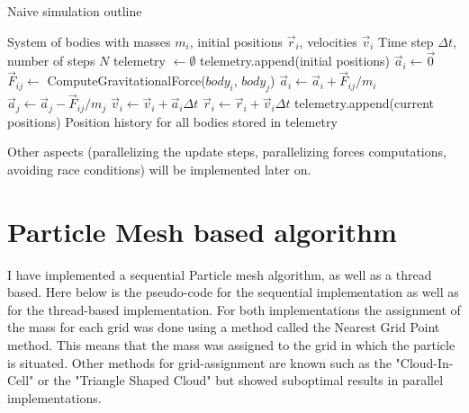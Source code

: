 \documentclass{article}
\begin{document}
\begin{algorithm}[H]
    \caption{Naive simulation outline}\label{alg:cap}
    \begin{algorithmic}
        \Require System of bodies with masses $m_i$, initial positions $\vec{r}_i$, velocities $\vec{v}_i$
        \Require Time step $\Delta t$, number of steps $N$
        \State telemetry $\gets \emptyset$
        \State telemetry.append(initial positions)
                \State $\vec{a}_i \gets \vec{0}$ 
            \EndFor
                    \State $\vec{F}_{ij} \gets$ ComputeGravitationalForce($body_i$, $body_j$)
                    \State $\vec{a}_i \gets \vec{a}_i + \vec{F}_{ij}/m_i$
                    \State $\vec{a}_j \gets \vec{a}_j - \vec{F}_{ij}/m_j$
                \EndFor
            \EndFor
                \State $\vec{v}_i \gets \vec{v}_i + \vec{a}_i\Delta t$ 
                \State $\vec{r}_i \gets \vec{r}_i + \vec{v}_i\Delta t$ 
            \EndFor
            \State telemetry.append(current positions)
        \EndFor
        \Ensure Position history for all bodies stored in telemetry
    \end{algorithmic}
\end{algorithm}

Other aspects (parallelizing the update steps, parallelizing forces computations, avoiding race conditions) will be implemented later on.

\section{Particle Mesh based algorithm}

I have implemented a sequential Particle mesh algorithm, as well as a thread based. 
Here below is the pseudo-code for the sequential implementation as well as for the thread-based implementation. 
For both implementations the assignment of the mass for each grid was done using a method called the Nearest Grid Point method. This means that the mass was assigned to the grid in which the particle is situated. Other methods for grid-assignment are known such as the "Cloud-In-Cell" or the "Triangle Shaped Cloud" but showed suboptimal results in parallel implementations. 
\end{document}

